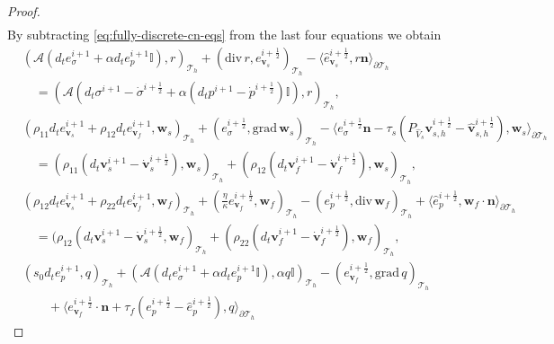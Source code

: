 \documentclass[10pt,letterpaper]{amsart}
\theoremstyle{plain} %
\theoremstyle{remark} %
\newcommand{\vect}[1]{\mathbf{#1}}
\newcommand{\divergence}{\mathrm{div}\,}
\newcommand{\grad}{\mathrm{grad}\,}
\newcommand{\Id}{\mathbb{I}} %
\newcommand{\Ael}{\mathcal{A}} %
\newcommand{\Thprod}[2]{( #1, #2 )_{\mathcal{T}_h}}
\newcommand{\pThprod}[2]{\langle #1, #2 \rangle_{\partial \mathcal{T}_{h}}}
\begin{document}
\begin{proof}
\begin{align*}
	\end{align*}
%
By subtracting \eqref{eq:fully-discrete-cn-eqs} from the last four equations we obtain %
%
	\begin{align*}
		&\Thprod{\Ael(d_t e_{\sigma}^{i+1} + \alpha d_te_{p}^{i+1} \Id)}{r} +\Thprod{\divergence r}{e_{\vect{v}_{s}}^{i+\frac 12}} -\pThprod{\widehat{e}_{\vect{v}_{s}}^{i+\frac 12}}{r \vect{n}} 
		\\
		&\quad = \Thprod{\Ael(d_t \sigma^{i+1} - \dot{\sigma}^{i+\frac 12} + \alpha (d_t{p}^{i+1} - \dot{p}^{i+\frac 12})\Id)}{r} ,
		\\ 
		&\Thprod{\rho_{11}d_t e_{\vect{v}_{s}}^{i+1}+\rho_{12}d_t e_{\vect{v}_{f}}^{i+1}}{\vect{w}_{s}} 
		+ \Thprod{e_{\sigma}^{i+\frac 12} }{\grad \vect{w}_{s}} - \pThprod{e_{\sigma}^{i+\frac 12} \vect{n} - \tau_s ({P_{\widehat{V}_s}} \vect{v}_{s,h}^{i+\frac 12} - \widehat{\vect{v}}_{s,h}^{i+\frac 12})}{\vect{w}_{s}}
		\\
		&\quad=  \Thprod{\rho_{11}(d_t{\vect{v}}_{s}^{i+1}-\dot{\vect{v}}_s^{i+\frac 12})}{\vect{w}_{s}} + \Thprod{\rho_{12}(d_t{\vect{v}}_{f}^{i+1}-\dot{\vect{v}}_f^{i+\frac 12}) }{\vect{w}_{s}}, 
		\\
		&\Thprod{\rho_{12}d_t e_{\vect{v}_{s}}^{i+1}+\rho_{22}d_t e_{\vect{v}_{f}}^{i+1}}{\vect{w}_f} + \Thprod{\frac{\eta}{\kappa} e_{\vect{v}_{f}}^{i+\frac 12}}{\vect{w}_{f}} 
		- \Thprod{e_p^{i+\frac 12} }{\divergence\vect{w}_{f}} +\pThprod{\widehat{e}_p^{i+\frac 12}}{\vect{w}_{f}\cdot\vect{n}} 
		\\
		&\quad = \Thprod{\rho_{12}(d_t{\vect{v}}_{s}^{i+1} - \dot{\vect{v}}_{s}^{i+\frac 12}}{\vect{w}_f} + \Thprod{\rho_{22}(d_t{\vect{v}}_{f}^{i+1} - \dot{\vect{v}}_{f}^{i+\frac 12})}{\vect{w}_{f}} , 
		\\
		&\Thprod{s_{0}d_t e_{p}^{i+1}}{q} + \Thprod{\Ael(d_t e_{\sigma}^{i+1}+\alpha d_t e_{p}^{i+1}\Id)}{\alpha q\Id} - \Thprod{e_{\vect{v}_{f}}^{i+\frac 12}}{\grad q}
		\\
		&\qquad + \pThprod{e_{\vect{v}_{f}}^{i+\frac 12}\cdot \vect{n} + \tau_{f} (e_p^{i+\frac 12} - \widehat{e}_p^{i+\frac 12})}{q}  

\end{align*}
\end{proof}
\end{document}
